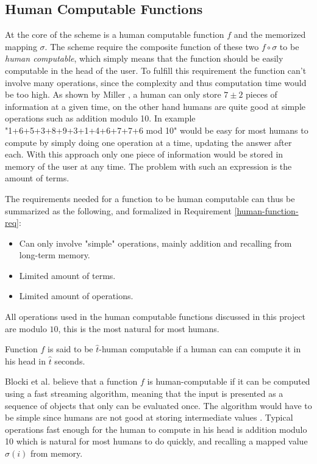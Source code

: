 \subsection{Human Computable Functions}
At the core of the scheme is a human computable function $f$ and the memorized mapping $\sigma$. The scheme require the composite function of these two $f \circ \sigma$ to be \emph{human computable}, which simply means that the function should be easily computable in the head of the user. To fulfill this requirement the function can't involve many operations, since the complexity and thus computation time would be too high. As shown by Miller \cite{magic-seven_miller}, a human can only store $7 \pm 2$ pieces of information at a given time, on the other hand humans are quite good at simple operations such as addition modulo 10. In example "1+6+5+3+8+9+3+1+4+6+7+7+6 mod 10" would be easy for most humans to compute by simply doing one operation at a time, updating the answer after each. With this approach only one piece of information would be stored in memory of the user at any time. The problem with such an expression is the amount of terms. 
\par The requirements needed for a function to be human computable can thus be summarized as the following, and formalized in Requirement \ref{human-function-req}:
\begin{itemize}
    \item Can only involve "simple" operations, mainly addition and recalling from long-term memory.
    \item Limited amount of terms.
    \item Limited amount of operations.
\end{itemize}
\begin{remark}
    All operations used in the human computable functions discussed in this project are modulo $10$, this is the most natural for most humans.
\end{remark}
\begin{requirement}
    \label{human-function-req}
    Function $f$ is said to be $\hat t$-human computable if a human can can compute it in his head in $\hat t$ seconds.
\end{requirement}

\par Blocki et al. \cite{hcp-blocki} believe that a function $f$ is human-computable if it can be computed using a fast streaming algorithm, meaning that the input is presented as a sequence of objects that only can be evaluated once. The algorithm would have to be simple since humans are not good at storing intermediate values \cite{magic-seven_miller}. Typical operations fast enough for the human to compute in his head is addition modulo 10 which is natural for most humans to do quickly, and recalling a mapped value $\sigma(i)$ from memory.

